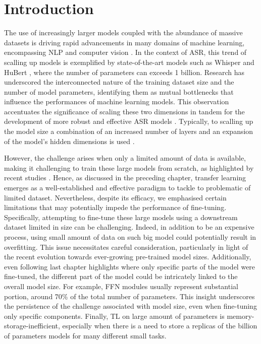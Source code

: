 \label{chap:5}
\cleardoublepage

\section{Introduction}
The use of increasingly larger models coupled with the abundance of massive datasets is driving rapid advancements in many domains of machine learning, encompassing NLP \cite{brown2020language} and computer vision \cite{ramesh2021zero}. In the context of ASR, this trend of scalling up models is exemplified by state-of-the-art models such as Whisper \cite{radford2023robust} and HuBert \cite{hsu2021hubert}, where the number of parameters can exceeds 1 billion. Research has underscored the interconnected nature of the training dataset size and the number of model parameters, identifying them as mutual bottlenecks that influence the performances of machine learning models. This observation accentuates the significance of scaling these two dimensions in tandem for the development of more robust and effective ASR models \cite{Kaplan2020ScalingLF}. Typically, to scalling up the model size a combination of an increased number of layers and an expansion of the model's hidden dimensions is used \cite{zheng22d_interspeech}.

However, the challenge arises when only a limited amount of data is available, making it challenging to train these large models from scratch, as highlighted by recent studies \cite{sri_end2end, gelin2021endtoend}. Hence, as discussed in the preceding chapter, transfer learning emerges as a well-established and effective paradigm to tackle to problematic of limited dataset. Nevertheless, despite its efficacy, we emphasised certain limitations that may potentially impede the performance of fine-tuning. Specifically, attempting to fine-tune these large models using a downstream dataset limited in size can be challenging. Indeed, in addition to be an expensive process, using small amount of data on such big model could potentially result in overfitting. This issue necessitates careful consideration, particularly in light of the recent evolution towards ever-growing pre-trained model sizes. Additionally, even following last chapter highlights where only specific parts of the model were fine-tuned, the different part of the model could be intricately linked to the overall model size. For example, FFN modules usually represent substantial portion, around 70\% of the total number of parameters. This insight underscores the persistence of the challenge associated with model size, even when fine-tuning only specific components. Finally, TL on large amount of parameters is memory-storage-inefficient, especially when there is a need to store a replicas of the billion of parameters models for many different small tasks.


